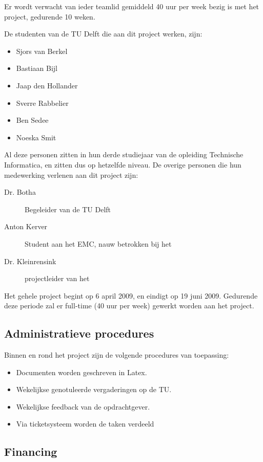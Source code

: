Er wordt verwacht van ieder teamlid gemiddeld 40 uur per week bezig is met het project, gedurende 10 weken.

De studenten van de TU Delft die aan dit project werken, zijn:
\begin{itemize}
	\item Sjors van Berkel
	\item Bastiaan Bijl
	\item Jaap den Hollander
	\item Sverre Rabbelier
	\item Ben Sedee
	\item Noeska Smit
\end{itemize}
Al deze personen zitten in hun derde studiejaar van de opleiding Technische Informatica, en zitten dus op hetzelfde niveau. 
De overige personen die hun medewerking verlenen aan dit project zijn:
\begin{description}
	\item[Dr. Botha] Begeleider van de TU Delft
	\item[Anton Kerver] Student aan het EMC, nauw betrokken bij het \casamproject
	\item[Dr. Kleinrensink] projectleider van het \casamproject
\end{description}

Het gehele project begint op 6 april 2009, en eindigt op 19 juni 2009. 
Gedurende deze periode zal er full-time (40 uur per week) gewerkt worden aan het project.

\subsection{Administratieve procedures}


Binnen en rond het project zijn de volgende procedures van toepassing:

\begin{itemize}
    \item Documenten worden geschreven in Latex.
    \item Wekelijkse genotuleerde vergaderingen op de TU.
    \item Wekelijkse feedback van de opdrachtgever.
    \item Via ticketsysteem worden de taken verdeeld
\end{itemize}


\subsection{Financing}

